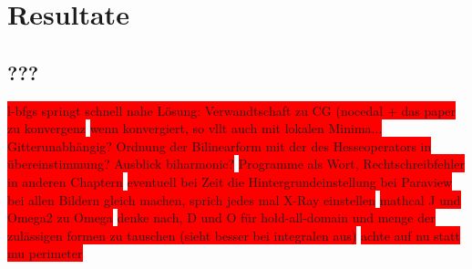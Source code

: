 
\section{Resultate}
\subsection{???}

\colorbox{red}{l-bfgs springt schnell nahe Lösung: Verwandtschaft zu CG (nocedal + das paper zu konvergenz} \newline
\colorbox{red}{wenn konvergiert, so vllt auch mit lokalen Minima...} \newline
\colorbox{red}{Gitterunabhängig? Ordnung der Bilinearform mit der des Hesseoperators in übereinstimmung? Ausblick biharmonic?} \newline
\colorbox{red}{Programme als Wort, Rechtschreibfehler in anderen Chaptern} \newline
\colorbox{red}{ eventuell bei Zeit die Hintergrundeinstellung bei Paraview bei allen Bildern gleich machen, sprich jedes mal X-Ray einstellen} \newline
\colorbox{red}{mathcal J und Omega2 zu Omega} \newline
\colorbox{red}{denke nach, D und O für hold-all-domain und menge der zulässigen formen zu tauschen (sieht besser bei integralen aus)} \newline
\colorbox{red}{achte auf nu statt mu perimeter}

